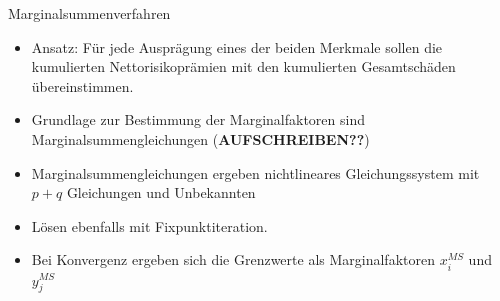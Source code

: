 \documentclass[12pt]{report}
\theoremstyle{dotless}
\theoremstyle{definition}
\begin{document}
Marginalsummenverfahren
\begin{itemize}
\item Ansatz: Für jede Ausprägung eines der beiden Merkmale sollen die kumulierten Nettorisikoprämien mit den kumulierten Gesamtschäden übereinstimmen.
\item Grundlage zur Bestimmung der Marginalfaktoren sind Marginalsummengleichungen (\textbf{AUFSCHREIBEN??})
\item Marginalsummengleichungen ergeben nichtlineares Gleichungssystem mit $p+q$ Gleichungen und Unbekannten
\item Lösen ebenfalls mit Fixpunktiteration. 
\item Bei Konvergenz ergeben sich die Grenzwerte als Marginalfaktoren $x_i^{MS}$ und $y_j^{MS}$
\end{itemize}
\end{document}
